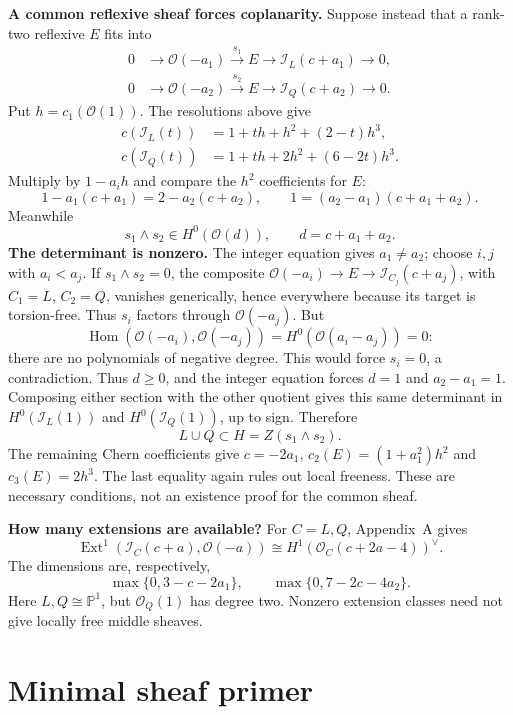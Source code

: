 \documentclass[11pt,a4paper]{article}
\begin{document}
\textbf{A common reflexive sheaf forces
coplanarity.}
Suppose instead that a rank-two
reflexive $E$ fits into
$$
\begin{aligned}
0&\to\mathcal{O}(-a_1)\xrightarrow{s_1}E
\to\mathcal{I}_L(c+a_1)\to0,\\
0&\to\mathcal{O}(-a_2)\xrightarrow{s_2}E
\to\mathcal{I}_Q(c+a_2)\to0.
\end{aligned}
$$
Put $h=c_1(\mathcal{O}(1))$.
The resolutions above give
$$
\begin{aligned}
c(\mathcal{I}_L(t))
&=1+th+h^2+(2-t)h^3,\\
c(\mathcal{I}_Q(t))
&=1+th+2h^2+(6-2t)h^3.
\end{aligned}
$$
Multiply by $1-a_i h$ and compare
the $h^2$ coefficients for $E$:
$$
1-a_1(c+a_1)=2-a_2(c+a_2),
\qquad
1=(a_2-a_1)(c+a_1+a_2).
$$
Meanwhile
$$
s_1\wedge s_2\in H^0(\mathcal{O}(d)),
\qquad d=c+a_1+a_2.
$$
\textbf{The determinant is nonzero.}
The integer equation gives $a_1\ne a_2$;
choose $i,j$ with $a_i<a_j$.
If $s_1\wedge s_2=0$, the composite
$\mathcal{O}(-a_i)\to E\to
\mathcal{I}_{C_j}(c+a_j)$, with
$C_1=L$, $C_2=Q$, vanishes generically,
hence everywhere because its target
is torsion-free. Thus $s_i$ factors
through $\mathcal{O}(-a_j)$. But
$$
\operatorname{Hom}(\mathcal{O}(-a_i),
\mathcal{O}(-a_j))
=H^0(\mathcal{O}(a_i-a_j))=0:
$$
there are no polynomials of negative
degree. This would force $s_i=0$,
a contradiction.
Thus $d\geq0$, and the integer equation
forces $d=1$ and $a_2-a_1=1$.
Composing either section with the other
quotient gives this same determinant
in $H^0(\mathcal{I}_L(1))$ and
$H^0(\mathcal{I}_Q(1))$, up to sign.
Therefore
$$
\boxed{L\cup Q\subset H=Z(s_1\wedge s_2).}
$$
The remaining Chern coefficients give
$c=-2a_1$, $c_2(E)=(1+a_1^2)h^2$ and
$c_3(E)=2h^3$. The last equality again
rules out local freeness. These are
necessary conditions, not an existence
proof for the common sheaf.

\textbf{How many extensions are available?}
For $C=L,Q$, Appendix~A gives
$$
\operatorname{Ext}^1
(\mathcal{I}_C(c+a),\mathcal{O}(-a))
\cong H^1(\mathcal{O}_C(c+2a-4))^\vee.
$$
The dimensions are, respectively,
$$
\max\{0,3-c-2a_1\},\qquad
\max\{0,7-2c-4a_2\}.
$$
Here $L,Q\cong\mathbb{P}^1$, but
$\mathcal{O}_Q(1)$ has degree two.
Nonzero extension classes need not give
locally free middle sheaves.

\newpage
\appendix
\section{Minimal sheaf primer}
\end{document}
